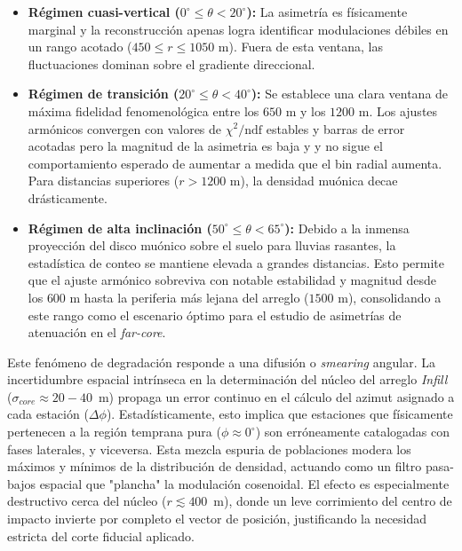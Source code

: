 \begin{itemize}
	\item \textbf{Régimen cuasi-vertical ($0^\circ \le \theta < 20^\circ$):} La asimetría es físicamente marginal y la reconstrucción apenas logra identificar modulaciones débiles en un rango acotado ($450 \le r \le 1050\text{ m}$). Fuera de esta ventana, las fluctuaciones dominan sobre el gradiente direccional.
	
	\item \textbf{Régimen de transición ($20^\circ \le \theta < 40^\circ$):} Se establece una clara ventana de máxima fidelidad fenomenológica entre los $650\text{ m}$ y los $1200\text{ m}$. Los ajustes armónicos convergen con valores de $\chi^2/\mathrm{ndf}$ estables y barras de error acotadas pero la magnitud de la asimetria es baja y y no sigue el comportamiento esperado de aumentar a medida que el bin radial aumenta. Para distancias superiores ($r > 1200\text{ m}$), la densidad muónica decae drásticamente.
	
	\item \textbf{Régimen de alta inclinación ($50^\circ \le \theta < 65^\circ$):} Debido a la inmensa proyección del disco muónico sobre el suelo para lluvias rasantes, la estadística de conteo se mantiene elevada a grandes distancias. Esto permite que el ajuste armónico sobreviva con notable estabilidad y magnitud desde los $600\text{ m}$ hasta la periferia más lejana del arreglo ($1500\text{ m}$), consolidando a este rango como el escenario óptimo para el estudio de asimetrías de atenuación en el \textit{far-core}.
\end{itemize}

Este fenómeno de degradación responde a una difusión o \textit{smearing} angular. La incertidumbre espacial intrínseca en la determinación del núcleo del arreglo \textit{Infill} ($\sigma_{core} \approx 20 - 40$~m) propaga un error continuo en el cálculo del azimut asignado a cada estación ($\Delta \phi$). Estadísticamente, esto implica que estaciones que físicamente pertenecen a la región temprana pura ($\phi \approx 0^\circ$) son erróneamente catalogadas con fases laterales, y viceversa. Esta mezcla espuria de poblaciones modera los máximos y mínimos de la distribución de densidad, actuando como un filtro pasa-bajos espacial que "plancha" la modulación cosenoidal. El efecto es especialmente destructivo cerca del núcleo ($r \lesssim 400$~m), donde un leve corrimiento del centro de impacto invierte por completo el vector de posición, justificando la necesidad estricta del corte fiducial aplicado.



